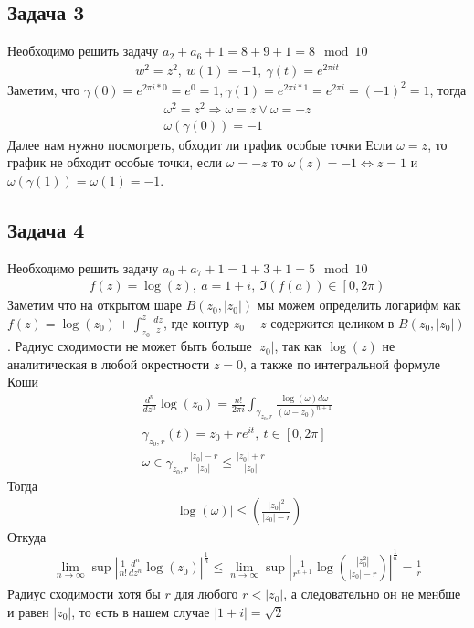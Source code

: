 \vskip 0.4in

\subsection*{Задача 3}
	Необходимо решить задачу $a_2 + a_6 + 1 = 8 + 9 + 1 = 8 \mod 10$
	\begin{gather*}
		w^2 = z^2,\ w(1) = -1,\ \gamma(t) = e^{2\pi i t}
	\end{gather*}
	Заметим, что $\gamma(0) = e^{2 \pi i * 0} = e^{0} = 1, \gamma(1) = e^{2 \pi i * 1} = e^{2 \pi i} = (-1)^2 = 1$, тогда
	\begin{gather*}
		\omega^2 = z^2 \Rightarrow \omega = z \vee \omega = -z\\
		\omega(\gamma(0)) = -1
	\end{gather*}
	Далее нам нужно посмотреть, обходит ли график особые точки
	Если $\omega = z$, то график не обходит особые точки, если $\omega = -z$ то $\omega(z) = -1 \Leftrightarrow z = 1$ и $\omega(\gamma(1)) = \omega(1) = -1$. 
\vskip 0.4in

\subsection*{Задача 4}
	Необходимо решить задачу $a_0 + a_7 + 1 = 1 + 3 + 1 = 5 \mod 10$
	\begin{gather*}
		f(z) = \log(z),\ a = 1 + i,\ \Im(f(a)) \in \left[0,2\pi\right)
	\end{gather*}
	Заметим что на открытом шаре $B(z_0, |z_0|)$ мы можем определить логарифм как $f(z) = \log(z_0) + \int_{z_0}^{z} \frac{dz}{z}$, где контур $z_0-z$ содержится целиком в $B(z_0, |z_0|)$. Радиус сходимости не может быть больше $|z_0|$, так как $\log(z)$ не аналитическая в любой окрестности $z = 0$, а также по интегральной формуле Коши
	\begin{gather*}
		\frac{d^n}{dz^n} \log(z_0) = \frac{n!}{2\pi i} \int_{\gamma_{z_0, r}} \frac{\log(\omega) d \omega}{(\omega - z_0)^{n+1}}\\
		\gamma_{z_0, r}(t) = z_0 + re^{it},\ t \in [0, 2\pi]\\
		\omega \in \gamma_{z_0, r} \frac{|z_0| - r}{|z_0|} \leqslant \frac{|z_0| + r}{|z_0|}
	\end{gather*}
	Тогда
	\begin{gather*}
		|\log(\omega)| \leqslant \left(\frac{|z_0|^2}{|z_0|-r}\right)
	\end{gather*}
	Откуда
	\begin{gather*}
		\lim\limits_{n \to \infty}\sup \left|\frac{1}{n!} \frac{d^n}{dz^n} \log(z_0)\right|^{\frac{1}{n}}
		\leqslant \lim\limits_{n \to \infty}\sup \left|\frac{1}{r^{n+1}} \log \left(\frac{|z_0^2|}{|z_0|-r}\right)\right|^{\frac{1}{n}}
		= \frac{1}{r}
	\end{gather*}
	Радиус сходимости хотя бы $r$ для любого $r < |z_0|$, а следовательно он не менбше и равен $|z_0|$, то есть в нашем случае $|1 + i| = \sqrt{2}$

\vskip 0.4in
